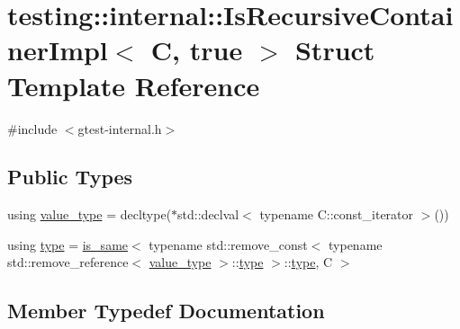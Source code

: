 \hypertarget{structtesting_1_1internal_1_1IsRecursiveContainerImpl_3_01C_00_01true_01_4}{}\section{testing\+:\+:internal\+:\+:Is\+Recursive\+Container\+Impl$<$ C, true $>$ Struct Template Reference}
\label{structtesting_1_1internal_1_1IsRecursiveContainerImpl_3_01C_00_01true_01_4}


{\ttfamily \#include $<$gtest-\/internal.\+h$>$}

\subsection*{Public Types}
\begin{DoxyCompactItemize}
\item 
using \hyperlink{structtesting_1_1internal_1_1IsRecursiveContainerImpl_3_01C_00_01true_01_4_a5e8e2cf58f0d2581e9e3ab5f5630cd61}{value\+\_\+type} = decltype($\ast$std\+::declval$<$ typename C\+::const\+\_\+iterator $>$())
\item 
using \hyperlink{structtesting_1_1internal_1_1IsRecursiveContainerImpl_3_01C_00_01true_01_4_a24b611fbe1b9a7c524ee54ae01324388}{type} = \hyperlink{structtesting_1_1internal_1_1is__same}{is\+\_\+same}$<$ typename std\+::remove\+\_\+const$<$ typename std\+::remove\+\_\+reference$<$ \hyperlink{structtesting_1_1internal_1_1IsRecursiveContainerImpl_3_01C_00_01true_01_4_a5e8e2cf58f0d2581e9e3ab5f5630cd61}{value\+\_\+type} $>$\+::\hyperlink{structtesting_1_1internal_1_1IsRecursiveContainerImpl_3_01C_00_01true_01_4_a24b611fbe1b9a7c524ee54ae01324388}{type} $>$\+::\hyperlink{structtesting_1_1internal_1_1IsRecursiveContainerImpl_3_01C_00_01true_01_4_a24b611fbe1b9a7c524ee54ae01324388}{type}, C $>$
\end{DoxyCompactItemize}


\subsection{Member Typedef Documentation}
\mbox{\label{structtesting_1_1internal_1_1IsRecursiveContainerImpl_3_01C_00_01true_01_4_a24b611fbe1b9a7c524ee54ae01324388}} 
